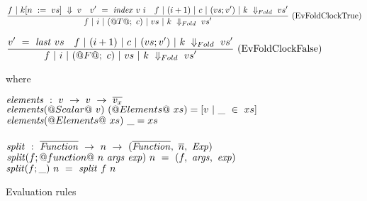 \begin{figure*}
$$
\frac {\displaystyle 
    f ~|~ k[n~:=~vs] ~\Downarrow~ v
    \quad
    v'~=~\mathit{index}~v~i
    \quad
f~|~(i+1)~|~c~|~(vs;v')~|~k~\Downarrow_{Fold}~vs'
} {\displaystyle 
f~|~i~|~(@T@;~c)~|~vs~|~k~\Downarrow_{Fold}~vs'
} \ 
\textrm{(EvFoldClockTrue)}
$$

$$
\frac {\displaystyle 
    v'~=~\mathit{last}~vs
    \quad
f~|~(i+1)~|~c~|~(vs;v')~|~k~\Downarrow_{Fold}~vs'
} {\displaystyle 
f~|~i~|~(@F@;~c)~|~vs~|~k~\Downarrow_{Fold}~vs'
} \ 
\textrm{(EvFoldClockFalse)}
$$




where
\begin{tabbing}
$\mathit{elements}~:~v~\to~v~\to~\overline{v_x}$\\
$\mathit{elements} (@Scalar@~v)~(@Elements@~xs) = [v~|~\_~\in~xs]$\\
$\mathit{elements} (@Elements@~xs)~\_ = xs$\\
\\
$\mathit{split}~:~\overline{\mathit{Function}}~\to~n~\to~(\overline{\mathit{Function}},~\overline{n},~\mathit{Exp})$\\
$\mathit{split} (f;@function@~n~\mathit{args}~\mathit{exp})~n~=~(f,~\mathit{args},~\mathit{exp})$ \\
$\mathit{split} (f;\_)~n~=~\mathit{split}~f~n$ \\
\end{tabbing}

\caption{Evaluation rules}
\label{fig:source:eval}
\end{figure*}


